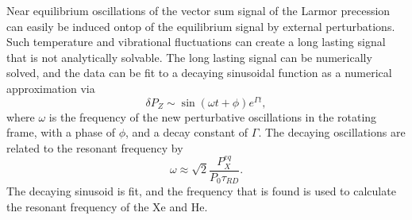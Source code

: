 Near equilibrium oscillations of the vector sum signal of the Larmor precession can easily be induced ontop of the equilibrium signal by external perturbations. Such temperature and vibrational fluctuations can create a long lasting signal that is not analytically solvable. The long lasting signal can be numerically solved, and the data can be fit to a decaying sinusoidal function as a numerical approximation via
\begin{equation}
    \delta P_Z\sim \sin{(\omega t + \phi)}e^{\Gamma t},\label{eq:maserPerturbedOmega}
\end{equation}
where $\omega$ is the frequency of the new perturbative oscillations in the rotating frame, with a phase of $\phi$, and a decay constant of $\Gamma$. The decaying oscillations are related to the resonant frequency by
\begin{equation}
    \omega \approx \sqrt{2} \frac{P^{eq}_X}{P_0 \tau_{RD}}.
\end{equation}
The decaying sinusoid is fit, and the frequency that is found is used to calculate the resonant frequency of the Xe and He. 
%
%
%
%

